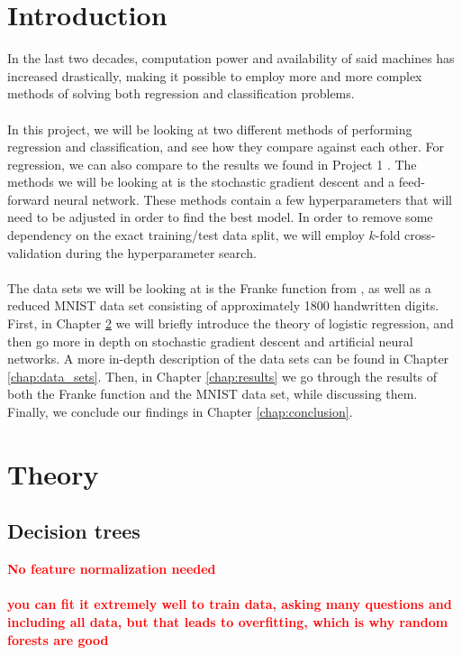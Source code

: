 \documentclass[a4paper]{article}
\newcommand\red[1]{\textcolor{red}{\textbf{#1}}}
\begin{document}
\section{Introduction}
In the last two decades, computation power and availability of said machines has increased drastically, making it possible to employ more and more complex methods of solving both regression and classification problems.
\\\\
In this project, we will be looking at two different methods of performing regression and classification, and see how they compare against each other. For regression, we can also compare to the results we found in Project 1 \cite{Github1}. The methods we will be looking at is the stochastic gradient descent and a feed-forward neural network. These methods contain a few hyperparameters that will need to be adjusted in order to find the best model. In order to remove some dependency on the exact training/test data split, we will employ $k$-fold cross-validation during the hyperparameter search.
\\\\
The data sets we will be looking at is the Franke function from \cite{Franke}, as well as a reduced MNIST data set \cite{MNIST} consisting of approximately 1800 handwritten digits.
First, in Chapter \ref{chap:theory} we will briefly introduce the theory of logistic regression, and then go more in depth on stochastic gradient descent and artificial neural networks. A more in-depth description of the data sets can be found in Chapter \ref{chap:data_sets}. Then, in Chapter \ref{chap:results} we go through the results of both the Franke function and the MNIST data set, while discussing them.
Finally, we conclude our findings in Chapter \ref{chap:conclusion}.


\section{Theory} \label{chap:theory}
\subsection{Decision trees} \label{sec:dec_tree}
\red{No feature normalization needed}
\\\\
\red{you can fit it extremely well to train data, asking many questions and including all data, but that leads to overfitting, which is why random forests are good}
\end{document}
